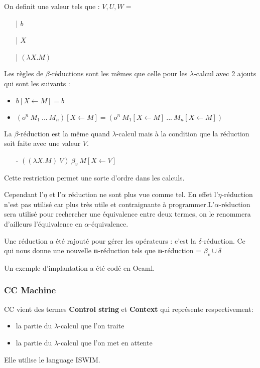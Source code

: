 \documentclass[10pt,a4paper]{article}
\begin{document}
				On definit une valeur tels que :
				\smallbreak
				$V,U,W =$
				\begin{itemize}
					\item[|] $b$
					\item[|] $X$
					\item[|] $(\lambda X.M)$
				\end{itemize}
				\bigbreak
				
				
				Les règles de $\beta$-réductions sont les mêmes que celle pour les $\lambda$-calcul avec 2 ajouts qui sont les suivants :
				\begin{itemize}
					\item $b[X \longleftarrow M] = b$
					\item $(o^{n}~M_{1}~...~M_{n})[X \longleftarrow M] = (o^{n}~M_{1}[X \longleftarrow M]~...~M_{n}[X \longleftarrow M])$
				\end{itemize}
				\bigbreak
			
			
				La $\beta$-réduction est la même quand $\lambda$-calcul mais à la condition que la réduction soit faite avec une valeur $V$. 
				\begin{itemize}
					\item[-] $((\lambda X.M)~V)~\beta_{v}~M[X \longleftarrow V]$
				\end{itemize} 
				\smallbreak
				Cette restriction permet une sorte d'ordre dans les calculs.
				\medbreak
				
				Cependant l'$\eta$ et l'$\alpha$ réduction ne sont plus vue comme tel. En effet l'$\eta$-réduction n'est pas utilisé car plus très utile et contraignante à programmer.L'$\alpha$-réduction sera utilisé pour rechercher une équivalence entre deux termes, on le renommera d'ailleurs l'équivalence en $\alpha$-équivalence.
				\medbreak
				
				Une réduction a été rajouté pour gérer les opérateurs : c'est la $\delta$-réduction. Ce qui nous donne une nouvelle \textbf{n}-réduction tels que \textbf{n}-réduction = $\beta_{v} \cup \delta$
				\bigbreak
				
				Un exemple d'implantation a été codé en Ocaml.
			
			\subsubsection{CC Machine}
			
				CC vient des termes \textbf{Control string} et \textbf{Context} qui représente respectivement:
				\begin{itemize}
					\item la partie du $\lambda$-calcul que l'on traite
					\item la partie du $\lambda$-calcul que l'on met en attente 
				\end{itemize}
				Elle utilise le language ISWIM.
				\bigbreak
				
\end{document}
